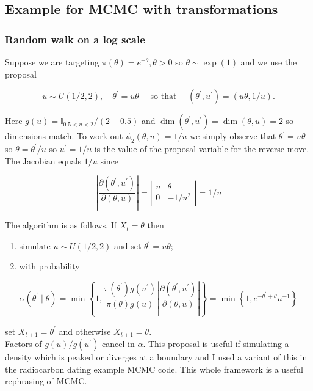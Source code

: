 \documentclass[10pt]{article}
\begin{document}
\subsection*{Example for MCMC with transformations}

\subsubsection*{Random walk on a log scale}
Suppose we are targeting $\pi(\theta)=e^{-\theta}, \theta>0$ so $\theta \sim \exp (1)$ and we use the proposal

$$
u \sim U(1 / 2,2), \quad \theta^{\prime}=u \theta \quad \text { so that } \quad\left(\theta^{\prime}, u^{\prime}\right)=(u \theta, 1 / u) .
$$

Here $g(u)=\mathbb{I}_{0.5<u<2} /(2-0.5)$ and $\operatorname{dim}\left(\theta^{\prime}, u^{\prime}\right)=\operatorname{dim}(\theta, u)=2$ so dimensions match. To work out $\psi_2(\theta, u)=1 / u$ we simply observe that $\theta^{\prime}=u \theta$ so $\theta=\theta^{\prime} / u$ so $u^{\prime}=1 / u$ is the value of the proposal variable for the reverse move. The Jacobian equals $1 / u$ since

$$
\left|\frac{\partial\left(\theta^{\prime}, u^{\prime}\right)}{\partial(\theta, u)}\right|=\left|\begin{array}{cc}
u & \theta \\
0 & -1 / u^2
\end{array}\right|=1 / u
$$

The algorithm is as follows. If $X_t=\theta$ then

\begin{enumerate}
  \item simulate $u \sim U(1 / 2,2)$ and set $\theta^{\prime}=u \theta$;
  \item with probability
\end{enumerate}

$$
\alpha\left(\theta^{\prime} \mid \theta\right)=\min \left\{1, \frac{\pi\left(\theta^{\prime}\right) g\left(u^{\prime}\right)}{\pi(\theta) g(u)}\left|\frac{\partial\left(\theta^{\prime}, u^{\prime}\right)}{\partial(\theta, u)}\right|\right\}=\min \left\{1, e^{-\theta^{\prime}+\theta} u^{-1}\right\}
$$

set $X_{t+1}=\theta^{\prime}$ and otherwise $X_{t+1}=\theta$.\\
Factors of $g(u) / g\left(u^{\prime}\right)$ cancel in $\alpha$. This proposal is useful if simulating a density which is peaked or diverges at a boundary and I used a variant of this in the radiocarbon dating example MCMC code. This whole framework is a useful rephrasing of MCMC.
\end{document}
